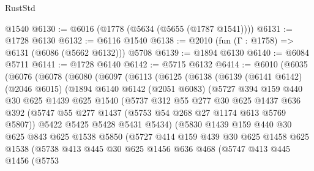 \begin{lexlean}{RustStd}
\begin{coremodule}
    @1540
@6130 := @6016 (@1778 (@5634 (@5655 (@1787 @1541))))
@6131 := @1728 @6130
@6132 := @6116 @1540
@6138 := @2010 (fun (Γ : @1758) => @6131 (@6086 (@5662 @6132))) @5708
@6139 := @1894 @6130
@6140 := @6084 @5711
@6141 := @1728 @6140
@6142 := @5715 @6132
@6414 := @6010
    (@6035
      (@6076
        (@6078
          (@6080
            (@6097
              (@6113
                (@6125
                  (@6138
                    (@6139
                      (@6141 @6142)
                      (@2046 @6015)
                      (@1894
                        @6140
                        @6142
                        (@2051 @6083)
                        (@5727
                          @394
                          @159
                          @440
                          @30
                          @625
                          @1439
                          @625
                          @1540
                          (@5737
                            @312
                            @55
                            @277
                            @30
                            @625
                            @1437
                            @636
                            @392
                            (@5747 @55 @277 @1437 (@5753 @54 @268 @27 @1174 @613 @5769 @5807))
                            @5422
                            @5425
                            @5428
                            @5431
                            @5434)
                          (@5830
                            @1439
                            @159
                            @440
                            @30
                            @625
                            @843
                            @625
                            @1538
                            @5850
                            (@5727
                              @414
                              @159
                              @439
                              @30
                              @625
                              @1458
                              @625
                              @1538
                              (@5738
                                @413
                                @445
                                @30
                                @625
                                @1456
                                @636
                                @468
                                (@5747
                                  @413
                                  @445
                                  @1456
                                  (@5753

\end{coremodule}
\end{lexlean}
